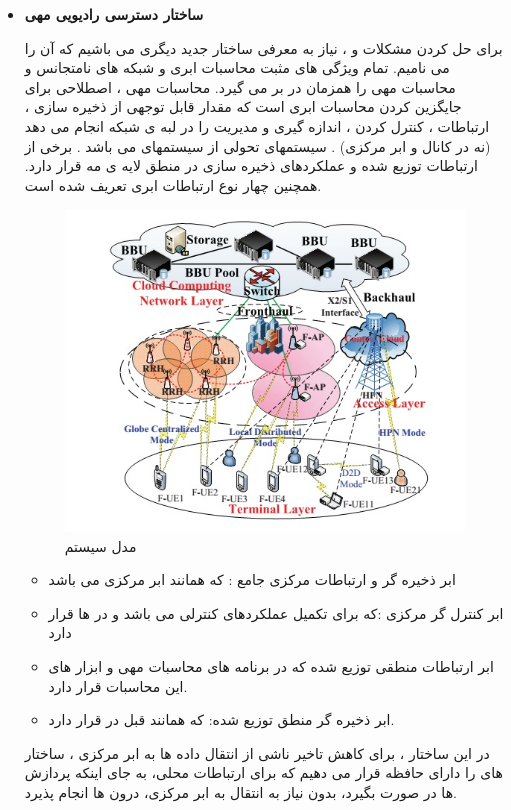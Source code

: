\begin{itemize}
\item \textbf{ساختار دسترسی رادیویی مهی}


برای حل کردن مشکلات  و ، نیاز به معرفی ساختار جدید دیگری می باشیم که آن را  می نامیم.
 تمام ویژگی های مثبت محاسبات ابری و شبکه های نامتجانس و محاسبات مهی را همزمان در بر می گیرد.
محاسبات مهی ، اصطلاحی برای جایگزین کردن محاسبات ابری است که مقدار قابل توجهی از ذخیره سازی ، ارتباطات ، کنترل کردن ، اندازه گیری و مدیریت را در لبه ی شبکه انجام می دهد (نه در کانال و ابر مرکزی) \cite{fogComputing, fogEdge}.
 سیستمهای  تحولی از سیستمهای  می باشد . برخی از ارتباطات توزیع شده و عملکردهای ذخیره سازی در منطق لایه ی مه قرار دارد. همچنین چهار نوع ارتباطات ابری تعریف شده است.
  \begin{figure}[H]
  \centering
    \includegraphics[scale =0.7]{./fig/fr}
  \caption{ مدل سیستم  \cite{fogComputing} }
  \label{fig:fr}
\end{figure}
 \begin{itemize}
 \item
 ابر ذخیره گر و ارتباطات مرکزی جامع :
 که همانند ابر مرکزی  می باشد
 \item
 ابر کنترل گر مرکزی :که برای تکمیل عملکردهای کنترلی  می باشد و در  ها قرار دارد
 \item
 ابر ارتباطات منطقی توزیع شده که در برنامه های محاسبات مهی و ابزار های این محاسبات قرار دارد.
 \item
  ابر ذخیره گر منطق توزیع شده:
  که همانند قبل در  قرار دارد.
 \end{itemize}
 در این ساختار ، برای کاهش تاخیر ناشی از انتقال داده ها به ابر مرکزی ، ساختار های  را دارای حافظه قرار می دهیم که برای ارتباطات محلی، به جای اینکه پردازش ها در  صورت بگیرد، بدون نیاز به انتقال به ابر مرکزی، درون  ها انجام پذیرد. 
\end{itemize}
